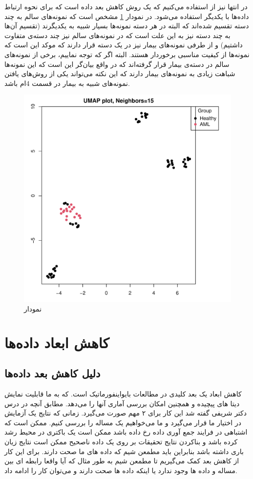 \documentclass{article}
\begin{document}
در انتها نیز از 
استفاده می‌کنیم که یک روش کاهش بعد داده است که برای نحوه ارتباط داده‌ها با یکدیگر استفاده می‌شود. در نمودار \ref{fig:umap} مشخص است که نمونه‌های سالم به چند دسته تقسیم شده‌اند که البته در هر دسته نمونه‌ها بسیار شبیه به یکدیگرند (تقسیم آن‌ها به چند دسته نیز به این علت است که در نمونه‌های سالم نیز چند دسته‌ی متفاوت داشتیم) و از طرفی نمونه‌های بیمار نیز در یک دسته قرار دارند که موکد این است که نمونه‌ها از کیفیت مناسبی برخوردار هستند. البته اگر که توجه نماییم، برخی از نمونه‌های سالم در دسته‌ی بیمار قرار گرفته‌اند که در واقع بیان‌گر این است که این نمونه‌ها شباهت زیادی به نمونه‌های بیمار دارند که این نکته می‌تواند یکی از روش‌های یافتن نمونه‌های شبیه به بیمار در قسمت 4‌ام باشد.

\begin{figure}[h!]
	\centering
	\includegraphics[width=0.5\columnwidth]{figs/umap.pdf}
	\caption{نمودار }
	\label{fig:umap}
\end{figure}

\section{کاهش ابعاد داده‌‌ها}
\subsection{دلیل کاهش بعد داده‌ها}
کاهش ابعاد یک بعد کلیدی در مطالعات بایواینفورماتیک است. که به ما قابلیت نمایش دیتا های پیچیده و همچنین امکان بررسی آماری آنها را می‌دهد.
مطابق آنچه در درس دکتر شریفی گفته شد این کار برای ۲ مهم صورت می‌گیرد. زمانی که نتایج یک آزمایش در اختیار ما قرار می‌گیرد و ما می‌خواهیم یک مساله را بررسی کنیم. ممکن است که اشتباهی در فرایند جمع آوری داده رخ داده باشد ممکن است یک باکتری در محیط رشد کرده باشد و بناکردن نتایج تحقیقات بر روی یک داده ناصحیح ممکن است نتایج زیان باری داشته باشد بنابراین باید مطمعن شیم که داده های ما صحت دارند. برای این کار از کاهش بعد کمک می‌گیریم تا مطمعن شیم به طور مثال که آیا واقعا رابطه ای بین مساله و داده ها وجود ندارد یا اینکه داده ها صحت دارند و می‌توان کار را ادامه داد.
\end{document}
